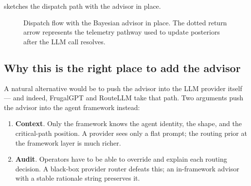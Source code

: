  sketches the dispatch path with the advisor in
place.

\begin{figure}[ht]
\centering

\caption{Dispatch flow with the Bayesian advisor in place. The dotted return
arrow represents the telemetry pathway used to update posteriors after the
LLM call resolves.}
\label{fig:dispatch-flow}
\end{figure}

\subsection{Why this is the right place to add the advisor}

A natural alternative would be to push the advisor into the LLM provider
itself --- and indeed, FrugalGPT \cite{chen2023frugalgpt} and RouteLLM
\cite{ong2024routellm} take that path. Two arguments push the advisor into
the agent framework instead:

\begin{enumerate}[leftmargin=*]
  \item \textbf{Context}. Only the framework knows the agent identity, the
        shape, and the critical-path position. A provider sees only a flat
        prompt; the routing prior at the framework layer is much richer.
  \item \textbf{Audit}. Operators have to be able to override and explain
        each routing decision. A black-box provider router defeats this; an
        in-framework advisor with a stable rationale string preserves it.
\end{enumerate}
